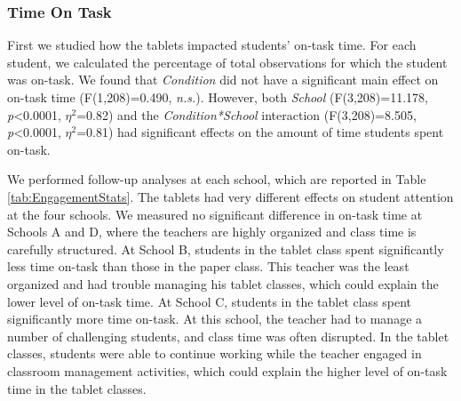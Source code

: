 \documentclass{sigchi}
\begin{document}
\subsubsection{Time On Task}
First we studied how the tablets impacted students' on-task time. For each student, we calculated the percentage of total observations for which the student was on-task. We found that \emph{Condition} did not have a significant main effect on on-task time (F(1,208)=0.490, \emph{n.s.}). However, both \emph{School} (F(3,208)=11.178, \emph{p}\textless0.0001, $\eta^2$=0.82) and the \emph{Condition*School} interaction (F(3,208)=8.505, \emph{p}\textless0.0001, $\eta^2$=0.81) had significant effects on the amount of time students spent on-task. 

We performed follow-up analyses at each school, which are reported in Table \ref{tab:EngagementStats}. The tablets had very different effects on student attention at the four schools. We measured no significant difference in on-task time at Schools A and D, where the teachers are highly organized and class time is carefully structured. At School B, students in the tablet class spent significantly less time on-task than those in the paper class. This teacher was the least organized and had trouble managing his tablet classes, which could explain the lower level of on-task time. At School C, students in the tablet class spent significantly more time on-task. At this school, the teacher had to manage a number of challenging students, and class time was often disrupted. In the tablet classes, students were able to continue working while the teacher engaged in classroom management activities, which could explain the higher level of on-task time in the tablet classes.

%
%
\end{document}
